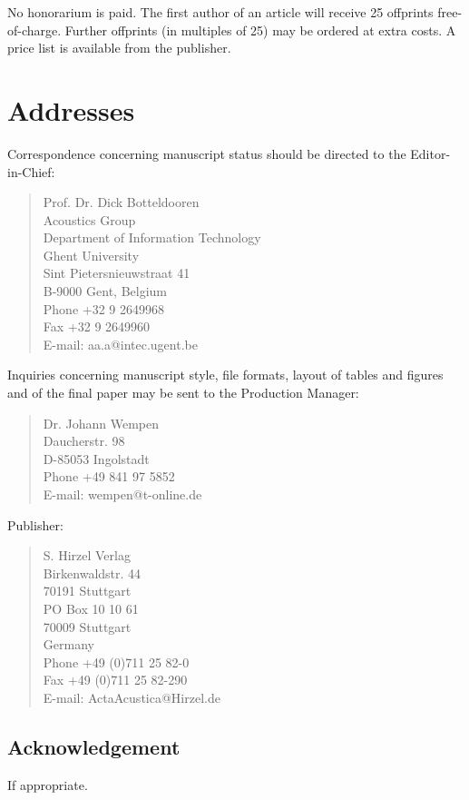 \documentclass[twoside,twocolumn]{article}
\begin{document}
No honorarium is paid. The first author of an article will receive 25
offprints free-of-charge. Further offprints (in multiples of 25) may be
ordered at extra costs. A price list is available from the publisher.

\section{Addresses}

Correspondence concerning manuscript status should be directed to the
Editor-in-Chief:

\begin{quote}
Prof. Dr. Dick Botteldooren\\
Acoustics Group\\
Department of Information Technology\\
Ghent University\\
Sint Pietersnieuwstraat 41\\
B-9000 Gent, Belgium\\
Phone +32 9 2649968\\
Fax +32 9 2649960\\
E-mail: aa.a@intec.ugent.be
\end{quote}

Inquiries concerning manuscript style, file formats, layout of tables
and figures and of the final paper may be sent to the Production
Manager:

\begin{quote}
Dr. Johann Wempen\\
Daucherstr. 98\\
D-85053 Ingolstadt\\
Phone +49 841 97 5852\\
E-mail: wempen@t-online.de
\end{quote}

\noindent
Publisher:

\begin{quote}
S. Hirzel Verlag\\
Birkenwaldstr. 44\\
70191 Stuttgart\\
PO Box 10 10 61\\
70009 Stuttgart\\
Germany\\
Phone +49 (0)711 25 82-0\\
Fax +49 (0)711 25 82-290\\
E-mail: ActaAcustica@Hirzel.de
\end{quote}

\subsection*{Acknowledgement}

If appropriate.

\end{document}
